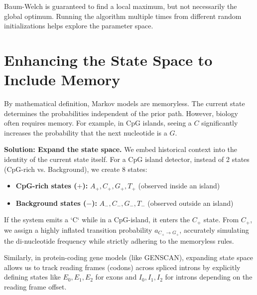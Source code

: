 \sta Baum-Welch is guaranteed to find a local maximum, but not necessarily the global optimum. Running the algorithm multiple times from different random initializations helps explore the parameter space.

\section{Enhancing the State Space to Include Memory}

By mathematical definition, Markov models are memoryless. The current state determines the probabilities independent of the prior path. However, biology often requires memory. For example, in CpG islands, seeing a \( C \) significantly increases the probability that the next nucleotide is a \( G \).

\textbf{Solution: Expand the state space.}
We embed historical context into the identity of the current state itself. For a CpG island detector, instead of 2 states (CpG-rich vs. Background), we create 8 states:
\begin{itemize}
    \item \textbf{CpG-rich states (\(+\)):} \( A_+, C_+, G_+, T_+ \) (observed inside an island)
    \item \textbf{Background states (\(-\)):} \( A_-, C_-, G_-, T_- \) (observed outside an island)
\end{itemize}



If the system emits a `C` while in a CpG-island, it enters the \( C_+ \) state. From \( C_+ \), we assign a highly inflated transition probability \( a_{C_+ \to G_+} \), accurately simulating the di-nucleotide frequency while strictly adhering to the memoryless rules.

Similarly, in protein-coding gene models (like GENSCAN), expanding state space allows us to track reading frames (codons) across spliced introns by explicitly defining states like \( E_0, E_1, E_2 \) for exons and \( I_0, I_1, I_2 \) for introns depending on the reading frame offset.
